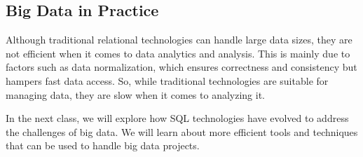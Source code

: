 \subsection{Big Data in Practice}

Although traditional relational technologies can handle large data
sizes, they are not efficient when it comes to data analytics and
analysis. This is mainly due to factors such as data normalization,
which ensures correctness and consistency but hampers fast data access.
So, while traditional technologies are suitable for managing data, they
are slow when it comes to analyzing it.

In the next class, we will explore how SQL technologies have evolved to
address the challenges of big data. We will learn about more efficient
tools and techniques that can be used to handle big data projects.
